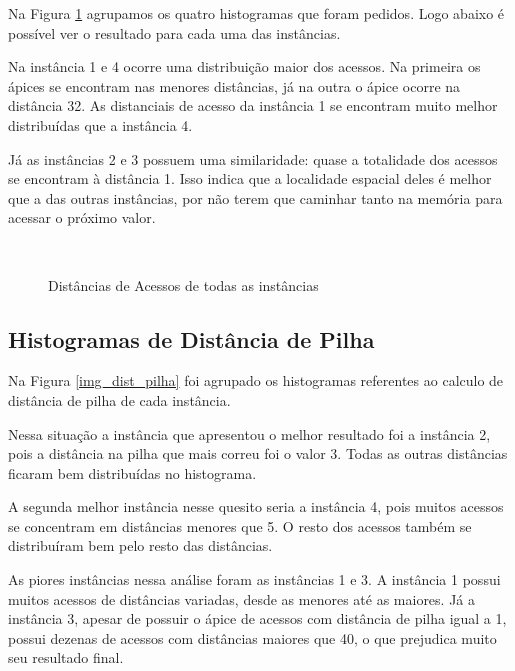 \documentclass[12pt]{article}
\begin{document}
Na Figura \ref{img_dist_acess} agrupamos os quatro histogramas que foram pedidos. Logo abaixo é possível ver o resultado para cada uma das instâncias.

Na instância 1 e 4 ocorre uma distribuição maior dos acessos. Na primeira os ápices se encontram nas menores distâncias, já na outra o ápice ocorre na distância 32. As distanciais de acesso da instância 1 se encontram muito melhor distribuídas que a instância 4.

Já as instâncias 2 e 3 possuem uma similaridade: quase a totalidade dos acessos se encontram à distância 1. Isso indica que a localidade espacial deles é melhor que a das outras instâncias, por não terem que caminhar tanto na memória para acessar o próximo valor.

\begin{figure}
\centering
\mbox{\quad
{}}
\mbox{\quad
{}}
\caption{Distâncias de Acessos de todas as instâncias} \label{img_dist_acess}
\end{figure}


\subsection{Histogramas de Distância de Pilha}
\label{hist_dist_pilha}


Na Figura \ref{img_dist_pilha} foi agrupado os histogramas referentes ao calculo de distância de pilha de cada instância.

Nessa situação a instância que apresentou o melhor resultado foi a instância 2, pois a distância na pilha que mais correu foi o valor 3. Todas as outras distâncias ficaram bem distribuídas no histograma.

A segunda melhor instância nesse quesito seria a instância 4, pois muitos acessos se concentram em distâncias menores que 5. O resto dos acessos também se distribuíram bem pelo resto das distâncias.

As piores instâncias nessa análise foram as instâncias 1 e 3. A instância 1 possui muitos acessos de distâncias variadas, desde as menores até as maiores. Já a instância 3, apesar de possuir o ápice de acessos com distância de pilha igual a 1, possui dezenas de acessos com distâncias maiores que 40, o que prejudica muito seu resultado final.
\end{document}
